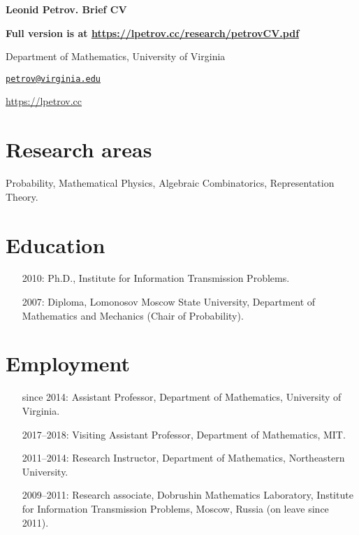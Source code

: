 \documentclass[letterpaper,11pt]{article}
\def\name{Leonid Petrov}
\begin{document}
\centerline{\huge \bf \name . Brief CV}
\bigskip

\textbf{Full version is at \url{https://lpetrov.cc/research/petrovCV.pdf}}

\noindent\hrulefill

\vspace{0.25in}

Department of Mathematics, University of Virginia

\href{mailto:petrov@virginia.edu}{\tt petrov@virginia.edu}

\url{https://lpetrov.cc}

\section*{Research areas}

Probability, Mathematical Physics, Algebraic Combinatorics, Representation
Theory.

\section*{Education}

\begin{itemize}
	\item [2010:]
		Ph.D., 
		Institute for Information Transmission Problems.

	\item [2007:]
		Diploma,
		Lomonosov Moscow State University,
		Department of Mathematics and Mechanics (Chair of Probability).
\end{itemize}

\section*{Employment}

\begin{itemize}
	\item
	      [since 2014:]
				Assistant Professor, Department of Mathematics, University
				of Virginia.
	\item
	      [2017--2018:]
				Visiting Assistant Professor, Department of Mathematics, MIT.
	\item
	      [2011--2014:]
				Research Instructor, Department of Mathematics, Northeastern
				University.
	\item
	      [2009--2011:]
				Research associate, Dobrushin Mathematics Laboratory,
	      Institute for Information Transmission Problems, Moscow, Russia (on leave
	      since 2011).
\end{itemize}
\end{document}
